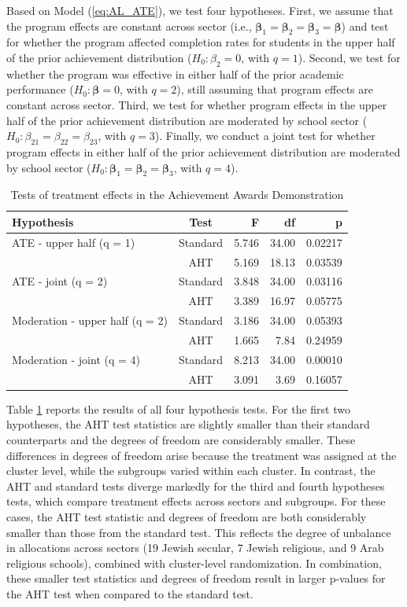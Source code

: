 \documentclass[12pt]{article}
\begin{document}
Based on Model (\ref{eq:AL_ATE}), we test four hypotheses. First, we
assume that the program effects are constant across sector (i.e.,
\(\boldsymbol\beta_1 = \boldsymbol\beta_2 = \boldsymbol\beta_3 = \boldsymbol\beta\))
and test for whether the program affected completion rates for students
in the upper half of the prior achievement distribution
(\(H_0: \beta_2 = 0\), with \(q = 1\)). Second, we test for whether the
program was effective in either half of the prior academic performance
(\(H_0: \boldsymbol\beta = 0\), with \(q = 2\)), still assuming that
program effects are constant across sector. Third, we test for whether
program effects in the upper half of the prior achievement distribution
are moderated by school sector
(\(H_0: \beta_{21} = \beta_{22} = \beta_{23}\), with \(q = 3\)).
Finally, we conduct a joint test for whether program effects in either
half of the prior achievement distribution are moderated by school
sector
(\(H_0: \boldsymbol\beta_1 = \boldsymbol\beta_2 = \boldsymbol\beta_3\),
with \(q = 4\)).

\begin{table}[bth]
\centering
\caption{Tests of treatment effects in the Achievement Awards Demonstration} 
\label{tab:AAD}
\begin{tabular}{lcrrr}
  \toprule
Hypothesis & Test & F & df & p \\ 
  \midrule
ATE - upper half (q = 1) & Standard & 5.746 & 34.00 & 0.02217 \\ 
   & AHT & 5.169 & 18.13 & 0.03539 \\ 
  ATE - joint (q = 2) & Standard & 3.848 & 34.00 & 0.03116 \\ 
   & AHT & 3.389 & 16.97 & 0.05775 \\ 
   \midrule
Moderation - upper half (q = 2) & Standard & 3.186 & 34.00 & 0.05393 \\ 
   & AHT & 1.665 & 7.84 & 0.24959 \\ 
  Moderation - joint (q = 4) & Standard & 8.213 & 34.00 & 0.00010 \\ 
   & AHT & 3.091 & 3.69 & 0.16057 \\ 
   \bottomrule
\end{tabular}
\end{table}

Table \ref{tab:AAD} reports the results of all four hypothesis tests.
For the first two hypotheses, the AHT test statistics are slightly
smaller than their standard counterparts and the degrees of freedom are
considerably smaller. These differences in degrees of freedom arise
because the treatment was assigned at the cluster level, while the
subgroups varied within each cluster. In contrast, the AHT and standard
tests diverge markedly for the third and fourth hypotheses tests, which
compare treatment effects across sectors and subgroups. For these cases,
the AHT test statistic and degrees of freedom are both considerably
smaller than those from the standard test. This reflects the degree of
unbalance in allocations across sectors (19 Jewish secular, 7 Jewish
religious, and 9 Arab religious schools), combined with cluster-level
randomization. In combination, these smaller test statistics and degrees
of freedom result in larger p-values for the AHT test when compared to
the standard test.
\end{document}
